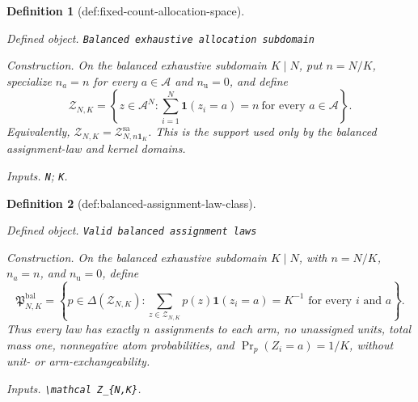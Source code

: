 \documentclass{article}
\newtheorem{definition}{Definition}
\begin{document}
\begin{definition}[def:fixed-count-allocation-space]\label{def:fixed-count-allocation-space}
\par\smallskip\noindent\emph{Defined object.} \texttt{Balanced exhaustive allocation subdomain}
\par\smallskip\noindent\emph{Construction.} On the balanced exhaustive subdomain \(K\mid N\), put \(n=N/K\), specialize \(n_a=n\) for every \(a\in\mathcal A\) and \(n_{\mathrm u}=0\), and define
\[
\mathcal Z_{N,K}=\left\{z\in\mathcal A^N:\sum_{i=1}^N\mathbf 1(z_i=a)=n\ \text{for every }a\in\mathcal A\right\}.
\]
Equivalently, \(\mathcal Z_{N,K}=\mathcal Z_{N,n\mathbf 1_K}^{\mathrm{sa}}\). This is the support used only by the balanced assignment-law and kernel domains.
\par\smallskip\noindent\emph{Inputs.} \texttt{N}; \texttt{K}.
\end{definition}

\begin{definition}[def:balanced-assignment-law-class]\label{def:balanced-assignment-law-class}
\par\smallskip\noindent\emph{Defined object.} \texttt{Valid balanced assignment laws}
\par\smallskip\noindent\emph{Construction.} On the balanced exhaustive subdomain \(K\mid N\), with \(n=N/K\), \(n_a=n\), and \(n_{\mathrm u}=0\), define
\[
\mathfrak P^{\mathrm{bal}}_{N,K}=\left\{p\in\Delta(\mathcal Z_{N,K}):\sum_{z\in\mathcal Z_{N,K}}p(z)\mathbf 1(z_i=a)=K^{-1}\text{ for every }i\text{ and }a\right\}.
\]
Thus every law has exactly \(n\) assignments to each arm, no unassigned units, total mass one, nonnegative atom probabilities, and \(\Pr_p(Z_i=a)=1/K\), without unit- or arm-exchangeability.
\par\smallskip\noindent\emph{Inputs.} \texttt{\textbackslash{}\allowbreak{}mathcal Z\_\allowbreak{}\{N,\allowbreak{}K\}\allowbreak{}}.
\end{definition}
\end{document}
